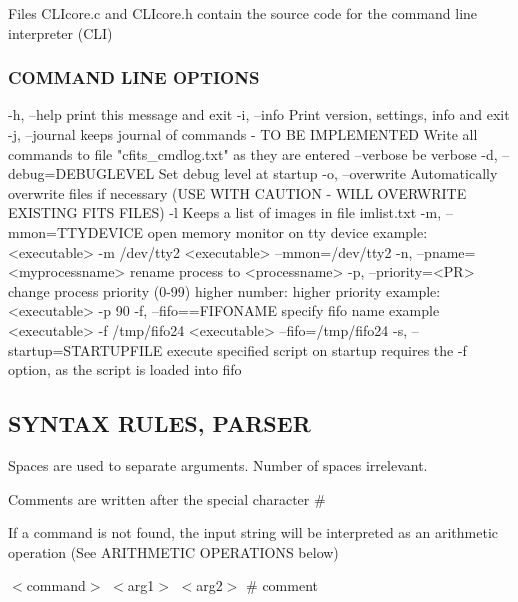 Files C\+L\+Icore.\+c and C\+L\+Icore.\+h contain the source code for the command line interpreter (C\+L\+I)

\subsubsection*{C\+O\+M\+M\+A\+N\+D L\+I\+N\+E O\+P\+T\+I\+O\+N\+S}

\begin{DoxyVerb}  -h, --help 
    print this message and exit
  -i, --info
    Print version, settings, info and exit
  -j, --journal
    keeps journal of commands - TO BE IMPLEMENTED 
    Write all commands to file "cfits_cmdlog.txt" as they are entered
  --verbose
    be verbose
  -d, --debug=DEBUGLEVEL
    Set debug level at startup
  -o, --overwrite 
    Automatically overwrite files if necessary (USE WITH CAUTION - WILL OVERWRITE EXISTING FITS FILES)
  -l
    Keeps a list of images in file imlist.txt
  -m, --mmon=TTYDEVICE
    open memory monitor on tty device
    example:
    <executable> -m /dev/tty2
    <executable> --mmon=/dev/tty2
  -n, --pname=<myprocessname>
    rename process to <processname>
  -p, --priority=<PR>
    change process priority (0-99)
    higher number: higher priority
    example:
    <executable> -p 90
  -f, --fifo==FIFONAME
        specify fifo name
        example
        <executable> -f /tmp/fifo24
        <executable> --fifo=/tmp/fifo24
  -s, --startup=STARTUPFILE
        execute specified script on startup
        requires the -f option, as the script is loaded into fifo
\end{DoxyVerb}


\subsection*{S\+Y\+N\+T\+A\+X R\+U\+L\+E\+S, P\+A\+R\+S\+E\+R}


\begin{DoxyItemize}
\item Spaces are used to separate arguments. Number of spaces irrelevant.
\item Comments are written after the special character \#
\item If a command is not found, the input string will be interpreted as an arithmetic operation (See A\+R\+I\+T\+H\+M\+E\+T\+I\+C O\+P\+E\+R\+A\+T\+I\+O\+N\+S below)
\end{DoxyItemize}

$<$command$>$ $<$arg1$>$ $<$arg2$>$ \# comment

